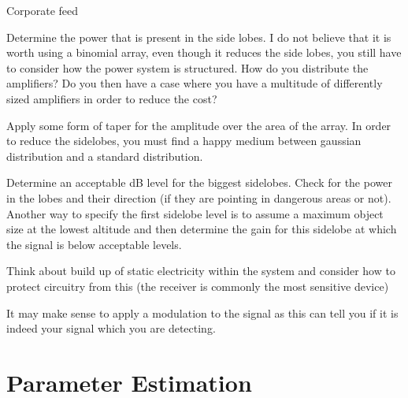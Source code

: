 \documentclass[11pt]{witseiepaper}
\begin{document}
Corporate feed

Determine the power that is present in the side lobes. 
I do not believe that it is worth using a binomial array, even though it reduces the side lobes, you still have to consider how the power system is structured. How do you distribute the amplifiers? Do you then have a case where you have a multitude of differently sized amplifiers in order to reduce the cost? 

Apply some form of taper for the amplitude over the area of the array.
In order to reduce the sidelobes, you must find a happy medium between gaussian distribution and a standard distribution.

Determine an acceptable dB level for the biggest sidelobes. Check for the power in the lobes and their direction (if they are pointing in dangerous areas or not). Another way to specify the first sidelobe level is to assume a maximum object size at the lowest altitude and then determine the gain for this sidelobe at which the signal is below acceptable levels.

Think about build up of static electricity within the system and consider how to protect circuitry from this (the receiver is commonly the most sensitive device)

It may make sense to apply a modulation to the signal as this can tell you if it is indeed your signal which you are detecting.




%





\appendix


\section{Parameter Estimation} \label{sec:ParameterEstimation}
\end{document}
